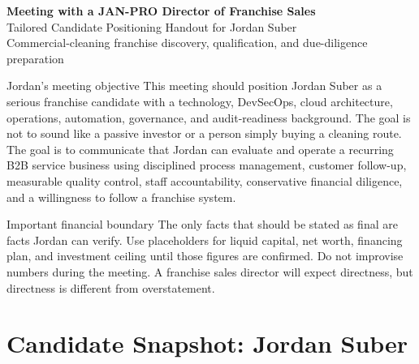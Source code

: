 \documentclass[11pt]{article}
\newcommand{\janpro}{JAN-PRO}
\newcommand{\candidate}{Jordan Suber}
\begin{document}
\begin{center}
  {\LARGE\bfseries Meeting with a \janpro{} Director of Franchise Sales}\\[0.35em]
  {\large Tailored Candidate Positioning Handout for \candidate}\\[0.4em]
  {\small Commercial-cleaning franchise discovery, qualification, and due-diligence preparation}
\end{center}

\vspace{0.5em}

\begin{keybox}{Jordan's meeting objective}
This meeting should position \candidate{} as a serious franchise candidate with a technology, DevSecOps, cloud architecture, operations, automation, governance, and audit-readiness background. The goal is not to sound like a passive investor or a person simply buying a cleaning route. The goal is to communicate that Jordan can evaluate and operate a recurring B2B service business using disciplined process management, customer follow-up, measurable quality control, staff accountability, conservative financial diligence, and a willingness to follow a franchise system.
\end{keybox}

\begin{warningbox}{Important financial boundary}
The only facts that should be stated as final are facts Jordan can verify. Use placeholders for liquid capital, net worth, financing plan, and investment ceiling until those figures are confirmed. Do not improvise numbers during the meeting. A franchise sales director will expect directness, but directness is different from overstatement.
\end{warningbox}

\section{Candidate Snapshot: Jordan Suber}
\end{document}

